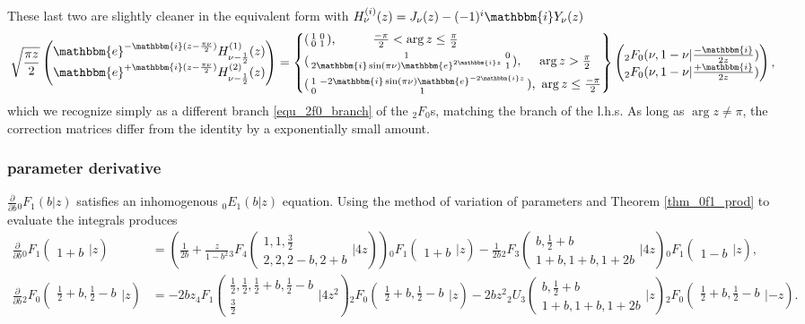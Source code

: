 \documentclass[12pt]{article}
\newcommand{\ee}[0] {\mathbbm{e}}
\newcommand{\ii}[0] {\mathbbm{i}}
\numberwithin{equation}{section}
\newcommand{\Head}[3] {{}_{#1}{#2}_{#3}}
\newcommand{\ArgS}[3] {( \begin{smallmatrix} #1 \\ #2 \end{smallmatrix} | {#3})}
\begin{document}
These last two are slightly cleaner in the equivalent form with $H_{\nu}^{(i)}(z) = J_{\nu}(z) - (-1)^i \ii Y_{\nu}(z)$
\begin{equation*}
\sqrt{\frac{\pi z}{2}} \begin{pmatrix}
\ee^{-\ii (z - \frac{\pi \nu}{2})}H_{\nu-\frac{1}{2}}^{(1)}(z)\\
\ee^{+\ii (z - \frac{\pi \nu}{2})}H_{\nu-\frac{1}{2}}^{(2)}(z)
\end{pmatrix}
=
\left\{
\begin{aligned}
&(\begin{smallmatrix} 1&0\\ 0 &1\end{smallmatrix})\text{,} \quad \quad \quad \tfrac{-\pi}{2} < \arg z \le \tfrac{\pi}{2}\\
&(\begin{smallmatrix} 1& 0\\ 2\ii \sin(\pi \nu) \ee^{2 \ii z} &1\end{smallmatrix})\text{, } \quad \arg z> \tfrac{\pi}{2}\\
&(\begin{smallmatrix} 1&-2\ii \sin(\pi \nu) \ee^{-2 \ii z}\\ 0  &1\end{smallmatrix})\text{, } \arg z \le \tfrac{-\pi}{2}
\end{aligned}
\right\}
\begin{pmatrix}
{}_2 F_0(\nu,1-\nu|\tfrac{-\ii}{2 z})\\
{}_2 F_0(\nu,1-\nu|\tfrac{+\ii}{2 z})
\end{pmatrix}\text{,}
\end{equation*}
which we recognize simply as a different branch \eqref{equ_2f0_branch} of the ${}_2 F_0$s, matching the branch of the l.h.s. As long as $\arg z \ne \pi$, the correction matrices differ from the identity by a exponentially small amount.

\subsubsection{parameter derivative}
$\frac{\partial}{\partial b} \Head{0}{F}{1}(b|z)$ satisfies an inhomogenous $\Head{0}{E}{1}(b|z)$ equation. Using the method of variation of parameters and Theorem \ref{thm_0f1_prod} to evaluate the integrals produces
\begin{align*}
\tfrac{\partial}{\partial b} \Head{0}{F}{1}\ArgS{}{1+b}{z} &= (\tfrac{1}{2 b} + \tfrac{z}{1-b^2} \Head{3}{F}{4}\ArgS{1,1,\frac32}{2,2,2-b,2+b}{4z})\Head{0}{F}{1}\ArgS{}{1+b}{z}-\tfrac{1}{2b}\Head{2}{F}{3}\ArgS{b,\frac12+b}{1+b,1+b,1+2 b}{4 z}\Head{0}{F}{1}\ArgS{}{1-b}{z}\text{,}\\
\tfrac{\partial}{\partial b} \Head{2}{F}{0}\ArgS{\frac12+b,\frac12-b}{}{z} &= -2 b z \Head{4}{F}{1} \ArgS{\frac12, \frac12, \frac12 +b, \frac12-b}{\frac32}{4 z^2} \Head{2}{F}{0} \ArgS{\frac12+b, \frac12-b}{}{z} - 2 b z^2 \Head{2}{U}{3}\ArgS{b,\frac12+b}{1+b, 1+b,1+2b}{z} \Head{2}{F}{0} \ArgS{\frac12+b,\frac12-b}{}{-z}\text{.}
\end{align*}
\end{document}
